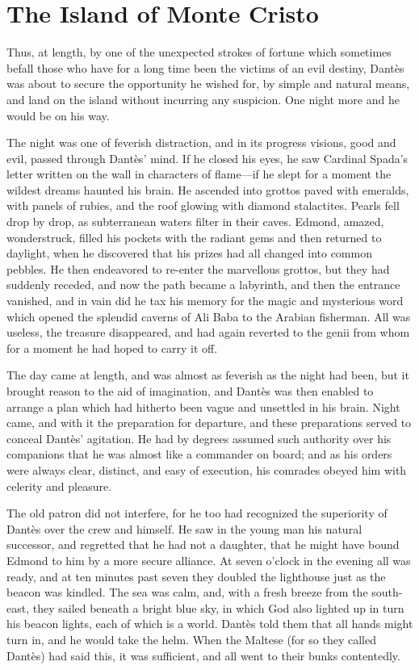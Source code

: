 \chapter{The Island of Monte Cristo}

Thus, at length, by one of the unexpected strokes of fortune which
sometimes befall those who have for a long time been the victims of an
evil destiny, Dantès was about to secure the opportunity he wished for,
by simple and natural means, and land on the island without incurring
any suspicion. One night more and he would be on his way.

The night was one of feverish distraction, and in its progress visions,
good and evil, passed through Dantès’ mind. If he closed his eyes, he
saw Cardinal Spada’s letter written on the wall in characters of
flame—if he slept for a moment the wildest dreams haunted his brain. He
ascended into grottos paved with emeralds, with panels of rubies, and
the roof glowing with diamond stalactites. Pearls fell drop by drop, as
subterranean waters filter in their caves. Edmond, amazed,
wonderstruck, filled his pockets with the radiant gems and then
returned to daylight, when he discovered that his prizes had all
changed into common pebbles. He then endeavored to re-enter the
marvellous grottos, but they had suddenly receded, and now the path
became a labyrinth, and then the entrance vanished, and in vain did he
tax his memory for the magic and mysterious word which opened the
splendid caverns of Ali Baba to the Arabian fisherman. All was useless,
the treasure disappeared, and had again reverted to the genii from whom
for a moment he had hoped to carry it off.

The day came at length, and was almost as feverish as the night had
been, but it brought reason to the aid of imagination, and Dantès was
then enabled to arrange a plan which had hitherto been vague and
unsettled in his brain. Night came, and with it the preparation for
departure, and these preparations served to conceal Dantès’ agitation.
He had by degrees assumed such authority over his companions that he
was almost like a commander on board; and as his orders were always
clear, distinct, and easy of execution, his comrades obeyed him with
celerity and pleasure.

The old patron did not interfere, for he too had recognized the
superiority of Dantès over the crew and himself. He saw in the young
man his natural successor, and regretted that he had not a daughter,
that he might have bound Edmond to him by a more secure alliance. At
seven o’clock in the evening all was ready, and at ten minutes past
seven they doubled the lighthouse just as the beacon was kindled. The
sea was calm, and, with a fresh breeze from the south-east, they sailed
beneath a bright blue sky, in which God also lighted up in turn his
beacon lights, each of which is a world. Dantès told them that all
hands might turn in, and he would take the helm. When the Maltese (for
so they called Dantès) had said this, it was sufficient, and all went
to their bunks contentedly.


